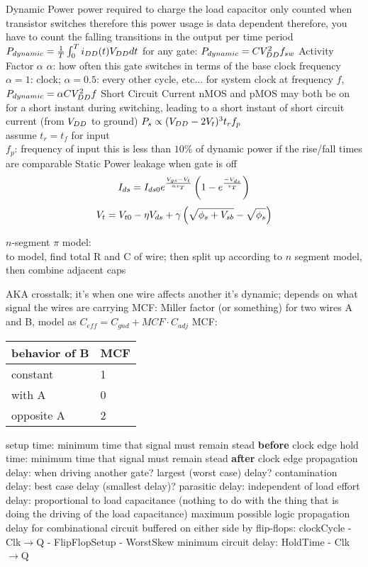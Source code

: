 \documentclass[12pt]{article}
\begin{document}
\begin{spacing}{0.8}
\begin{multicols*}{2}
\begin{flushleft}
\begin{outline}[longenum]
  \1 Dynamic Power
    \2 power required to charge the load capacitor
    \2 only counted when transistor switches
      \3 therefore this power usage is data dependent
      \3 therefore, you have to count the falling transitions in the output per time period
    \2 $P_{dynamic} = \frac{1}{T}\int_0^T i_{DD}(t) V_{DD} dt$
    \2 for any gate: $P_{dynamic} = C V_{DD}^2 f_{sw}$
  \1 Activity Factor $\alpha$
    \2 $\alpha$: how often this gate switches in terms of the base clock frequency
    \2 $\alpha=1$: clock; $\alpha=0.5$: every other cycle, etc...
    \2 for system clock at frequency $f$, $P_{dynamic} = \alpha C V_{DD}^2 f$
  \1 Short Circuit Current
    \2 nMOS and pMOS may both be on for a short instant during switching, leading to a short instant of short circuit current (from $V_{DD}$ to ground)
    \2 $P_s \propto (V_{DD} -2V_t)^3 t_r f_p$
      \\ assume $t_r=t_f$ for input
      \\ $f_p$: frequency of input
    \2 this is less than $10\%$ of dynamic power if the rise/fall times are comparable
  \1 Static Power
    \2 leakage when gate is off
    \2 
    $$ I_{ds} = I_{ds0} e^{\frac{V_{gs}-V_{t}}{nv_T}} \left( 1 - e^{\frac{-V_{ds}}{v_T}} \right) $$
    $$ V_t = V_{t0} - \eta V_{ds} + \gamma \left( \sqrt{\phi_s + V_{sb}} - \sqrt{\phi_s} \right) $$


  \1 $n$-segment $\pi$ model:
  \\ to model, find total R and C of wire; then split up according to $n$ segment model, then combine adjacent caps

  \1 AKA crosstalk; it's when one wire affects another
  \1 it's dynamic; depends on what signal the wires are carrying
  \1 MCF: Miller factor (or something)
  \1 for two wires A and B, model as $C_{eff} = C_{gnd} + MCF \cdot C_{adj}$
  \1 MCF: \begin{tabular}{l|l}
  behavior of B & MCF \\ \hline
  constant   & 1 \\
  with A     & 0 \\
  opposite A & 2 \\
  \end{tabular}

  \1 setup time: minimum time that signal must remain stead \textbf{before} clock edge
  \1 hold time:  minimum time that signal must remain stead \textbf{after}  clock edge
  \1 propagation delay: when driving another gate? largest (worst case) delay?
  \1 contamination delay: best case delay (smallest delay)?
  \1 parasitic delay: independent of load
  \1 effort delay: proportional to load capacitance (nothing to do with the thing that is doing the driving of the load capacitance)
  \1 maximum possible logic propagation delay for combinational circuit buffered on either side by flip-flops:
    clockCycle - Clk$\rightarrow$Q - FlipFlopSetup - WorstSkew
    \2 minimum circuit delay: HoldTime - Clk$\rightarrow$Q


\end{outline}
\end{flushleft}
\end{multicols*}
\end{spacing}
\end{document}
